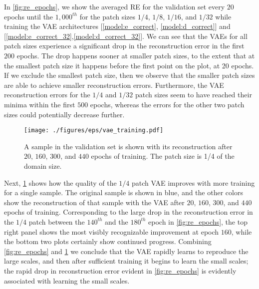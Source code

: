 \documentclass[final,3p]{elsarticle}
\theoremstyle{break}
\begin{document}
In \cref{fig:re_epochs}, we show the averaged RE for the validation set every $20$ epochs until the $1,000^{th}$ for the patch sizes $1/4$, $1/8$, $1/16$, and $1/32$ while training the VAE architectures [\cref{model:e_correct}, \cref{model:d_correct}] and [\cref{model:e_correct_32},\cref{model:d_correct_32}].
We can see that the VAEs for all patch sizes experience a significant drop in the reconstruction error in the first $200$ epochs.
The drop happens sooner at smaller patch sizes, to the extent that at the smallest patch size it happens before the first point on the plot, at 20 epochs.
If we exclude the smallest patch size, then we observe that the smaller patch sizes are able to achieve smaller reconstruction errors.  
Furthermore, the VAE reconstruction errors for the $1/4$ and $1/32$ patch sizes seem to have reached their minima within the first $500$ epochs, whereas the errors for the other two patch sizes could potentially decrease further.\par
\begin{figure}[b!]
	\centering
	\texttt{[image: ./figures/eps/vae\_training.pdf]}
	\caption{\label{fig:vae_training} A sample in the validation set is shown with its reconstruction after $20$, $160$, $300$, and $440$ epochs of training. The patch size is 1/4 of the domain size.}
\end{figure}

Next, \cref{fig:vae_training} shows how the quality of the $1/4$ patch VAE improves with more training for a single sample. 
The original sample is shown in blue, and the other colors show the reconstruction of that sample with the VAE after $20$, $160$, $300$, and $440$ epochs of training.
Corresponding to the large drop in the reconstruction error in the $1/4$ patch between the $140^{th}$ and the $180^{th}$ epoch in \cref{fig:re_epochs}, the top right panel shows the most visibly recognizable improvement at epoch $160$, while the bottom two plots certainly show continued progress.
Combining \cref{fig:re_epochs} and \cref{fig:vae_training} we conclude that the VAE rapidly learns to reproduce the large scales, and then after sufficient training it begins to learn the small scales; the rapid drop in reconstruction error evident in \cref{fig:re_epochs} is evidently associated with learning the small scales.
\end{document}
